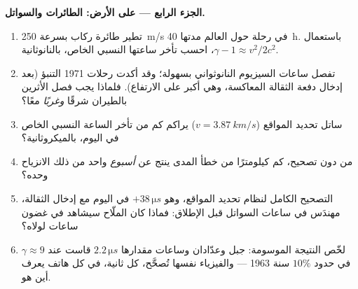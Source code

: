 \begin{problem}
\medskip\noindent\textbf{الجزء الرابع --- على الأرض: الطائرات
والسواتل.}
\begin{enumerate}[resume]
  \item تطير طائرة ركاب بسرعة \qty{250}{m/s} في رحلة حول
        العالم مدتها \qty{40}{h}. باستعمال $\gamma - 1 \approx v^2/2c^2$،
        احسب تأخر ساعتها النسبي الخاص، بالنانوثانية.
  \item تفصل ساعات السيزيوم النانوثواني بسهولة؛ وقد أكدت
        رحلات 1971 التنبؤ (بعد إدخال دفعة الثقالة المعاكسة،
        وهي أكبر على الارتفاع). فلماذا يجب فصل الأثرين
        بالطيران شرقًا \emph{وغربًا} معًا؟
  \item ساتل تحديد المواقع ($v = \qty{3.87}{km/s}$) يراكم كم
        من تأخر الساعة النسبي الخاص في اليوم، بالميكروثانية؟
  \item من دون تصحيح، كم كيلومترًا من خطأ المدى ينتج عن
        \emph{أسبوع} واحد من ذلك الانزياح وحده؟
  \item التصحيح الكامل لنظام تحديد المواقع، وهو $+38\,\unit{\micro s}$ في اليوم
        مع إدخال الثقالة، مهندَس في ساعات السواتل قبل
        الإطلاق: فماذا كان الملّاح سيشاهد في غضون ساعات لولاه؟
  \item لخّص النتيجة الموسومة: جبل وعدّادان وساعات مقدارها
        $2.2\,\unit{\micro s}$ قاست  عند
        $\gamma \approx 9$ في حدود $10\%$ سنة 1963 --- والفيزياء
        نفسها تُصحَّح، كل ثانية، في كل هاتف يعرف أين هو.
\end{enumerate}
\end{problem}
